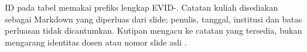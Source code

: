 ID pada tabel memakai prefiks lengkap EVID-. Catatan kuliah disediakan sebagai Markdown yang diperluas dari slide; penulis, tanggal, institusi dan batas perluasan tidak dicantumkan. Kutipan mengacu ke catatan yang tersedia, bukan mengarang identitas dosen atau nomor slide asli \parencite{lecture01,lecture02}.
